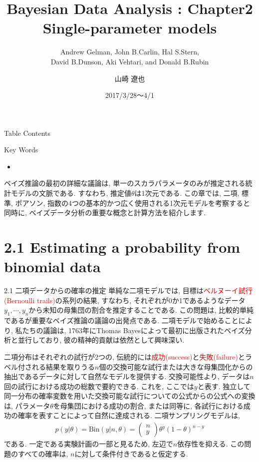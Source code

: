 \documentclass[10pt,dvipdfmx,a4]{beamer}
\title{Bayesian Data Analysis : Chapter2 \\Single-parameter models}
\subtitle{Andrew Gelman, John B.Carlin, Hal S.Stern,\\David B.Dunson, Aki Vehtari, and Donald B.Rubin}
\author{山崎 遼也}
\institute{情報学科 数理工学コース 4回}
\date{2017/3/28～4/1}
\newcommand{\eq}[1]{\begin{align}#1\end{align}}
\newcommand{\tcr}[1]{\textcolor{red}{#1}}
\begin{document}
\frame{\titlepage}

\begin{frame}{Table Contents}
\begin{multicols}{2}
{\scriptsize \tableofcontents}
\end{multicols}
\end{frame}

\begin{frame}{Key Words}
\begin{multicols}{2}
{\scriptsize \begin{itemize}
\item 
\end{itemize}}
\end{multicols}
\end{frame}


\begin{frame}
ベイズ推論の最初の詳細な議論は, 単一のスカラパラメータのみが推定される統計モデルの文脈である.
すなわち, 推定値$\theta$は1次元である.
この章では, 二項, 標準, ポアソン, 指数の4つの基本的かつ広く使用される1次元モデルを考察すると同時に, ベイズデータ分析の重要な概念と計算方法を紹介します.
\end{frame}

\section{2.1 Estimating a probability from binomial data}
\begin{frame}{2.1 二項データからの確率の推定}
単純な二項モデルでは, 目標は\tcr{ベルヌーイ試行(Bernoulli trails)}の系列の結果, すなわち, それぞれが0か1であるようなデータ$y_1,\cdots,y_n$から未知の母集団の割合を推定することである.
この問題は, 比較的単純であるが重要なベイズ推論の議論の出発点である.
二項モデルで始めることにより, 私たちの議論は, 1763年にThomas Bayesによって最初に出版されたベイズ分析と並行しており, 彼の精神的貢献は依然として興味深い.

二項分布はそれぞれの試行が2つの, 伝統的には\tcr{成功(success)}と\tcr{失敗(failure)}とラベル付される結果を取りうる$n$個の交換可能な試行または大きな母集団化からの抽出であるデータに対して自然なモデルを提供する.
交換可能性より, データは$n$回の試行における成功の総数で要約できる.
これを, ここでは$y$と表す.
独立して同一分布の確率変数を用いた交換可能な試行についての公式からの公式への変換は, パラメータ$\theta$を母集団における成功の割合, または同等に, 各試行における成功の確率を表すことによって自然に達成される.
二項サンプリングモデルは,
\eq{p(y|\theta)=\text{Bin}(y|n,\theta)=\left(\begin{array}{c}n\\y\end{array}\right)\theta^y(1-\theta)^{n-y}}
である.
一定である実験計画の一部と見るため, 左辺で$n$依存性を抑える.
この問題のすべての確率は, $n$に対して条件付きであると仮定する.
\end{frame}
\end{document}
